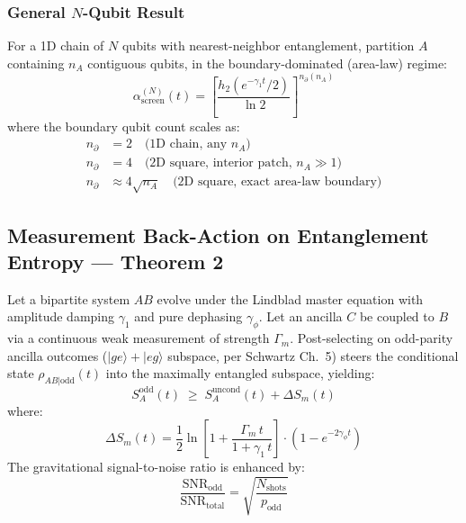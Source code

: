\documentclass[11pt,letterpaper]{article}
\newcommand{\SA}{S_A}
\newcommand{\asc}{\alpha_{\mathrm{screen}}}
\newcommand{\htwo}{h_2}
\newcommand{\nprt}{n_{\partial}}
\newcommand{\gamone}{\gamma_1}
\newcommand{\gamphi}{\gamma_\phi}
\begin{document}
\subsubsection{General $N$-Qubit Result}

\begin{theorembox}
For a 1D chain of $N$ qubits with nearest-neighbor entanglement, partition $A$ containing $n_A$ contiguous qubits, in the boundary-dominated (area-law) regime:
\begin{equation}
  \asc^{(N)}(t) = \left[\frac{\htwo(e^{-\gamone t}/2)}{\ln 2}\right]^{\nprt(n_A)}
  \label{eq:alpha_N}
\end{equation}
where the boundary qubit count scales as:
\begin{align}
  \nprt &= 2 \quad \text{(1D chain, any } n_A \text{)} \label{eq:nprt_1D}\\
  \nprt &= 4 \quad \text{(2D square, interior patch, } n_A \gg 1 \text{)} \label{eq:nprt_2D_min}\\
  \nprt &\approx 4\sqrt{n_A} \quad \text{(2D square, exact area-law boundary)} \label{eq:nprt_2D}
\end{align}
\end{theorembox}

\subsection{Measurement Back-Action on Entanglement Entropy --- Theorem 2}

\begin{theorembox}
Let a bipartite system $AB$ evolve under the Lindblad master equation with amplitude damping $\gamone$ and pure dephasing $\gamphi$. Let an ancilla $C$ be coupled to $B$ via a continuous weak measurement of strength $\Gamma_m$. Post-selecting on odd-parity ancilla outcomes ($|ge\rangle + |eg\rangle$ subspace, per Schwartz Ch.\ 5) steers the conditional state $\rho_{AB|\mathrm{odd}}(t)$ into the maximally entangled subspace, yielding:
\begin{equation}
  \SA^{\mathrm{odd}}(t) \;\geq\; \SA^{\mathrm{uncond}}(t) + \Delta S_m(t)
\end{equation}
where:
\begin{equation}
  \Delta S_m(t) = \frac{1}{2}\ln\!\left[1 + \frac{\Gamma_m\, t}{1 + \gamone\, t}\right] \cdot \left(1 - e^{-2\gamphi t}\right)
  \label{eq:DeltaS_backaction}
\end{equation}
The gravitational signal-to-noise ratio is enhanced by:
\begin{equation}
  \frac{\mathrm{SNR}_{\mathrm{odd}}}{\mathrm{SNR}_{\mathrm{total}}} = \sqrt{\frac{N_{\mathrm{shots}}}{p_{\mathrm{odd}}}}
\end{equation}
\end{theorembox}
\end{document}
